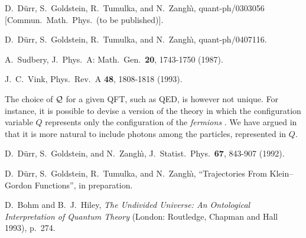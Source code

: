 \documentclass[prl, twocolumn, showpacs, superscriptaddress]{revtex4}%
\begin{document}
\begin{thebibliography}{28.}
 D.~D\"urr, S.~Goldstein, R.~Tumulka, and
   N.~Zangh{\`\i}, %
   quant-ph/0303056 [Commun.\ Math.\ Phys.\ (to be published)].

 D.~D\"urr, S.~Goldstein, R.~Tumulka, and
   N.~Zangh{\`\i}, %
   quant-ph/0407116.

 A.~Sudbery, %
   J.\ Phys.\ A: Math.\ Gen.\ \textbf{20}, 1743-1750 (1987).

 J.~C.~Vink,
   Phys.\ Rev.\ A \textbf{48}, 1808-1818 (1993).

 The choice of $\mathcal{Q}$ for a given QFT, such as QED, is
however not unique. For instance, it is possible to devise a version
of the theory in which the configuration variable $Q$ represents only
the configuration of the \emph{fermions} \cite{BellBeables}.  We have
argued in \cite{crea1} that it is more natural to include photons
among the particles, represented in $Q$.

 D.~D\"urr, S.~Goldstein, and N.~Zangh{\`\i}, 
   J.\ Statist.\ Phys.\ \textbf{67}, 843-907 (1992).

 D.~D\"urr, S.~Goldstein, R.~Tumulka, and N.~Zangh{\`\i},
   ``Trajectories From Klein--Gordon Functions'', in preparation.

 D.~Bohm and B.~J.~Hiley, \textit{The Undivided Universe: An
   Ontological Interpretation of Quantum Theory} (London: Routledge,
   Chapman and Hall 1993), p.~274.







\end{thebibliography}
\end{document}
